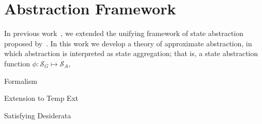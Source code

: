 \section{Abstraction Framework}

In previous work~\cite{abelhershko2016approx}, we extended the unifying framework of state abstraction proposed by~\cite{li2006towards}. In this work we develop a theory of approximate abstraction, in which abstraction is interpreted as state aggregation; that is, a state abstraction function $\phi : \mathcal{S}_G \mapsto \mathcal{S}_A$, 

Formalism

Extension to Temp Ext

Satisfying Desiderata